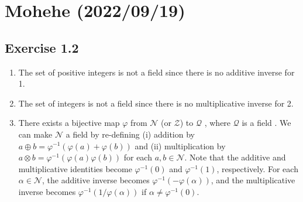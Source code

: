 \documentclass{article}
\newcommand\Z{\mathcal Z}
\newcommand\N{\mathcal N}
\newcommand\Q{\mathcal Q}
\begin{document}
\section{Mohehe (2022/09/19)}
\subsection{Exercise 1.2}
\begin{enumerate}[label = (\alph*)]
  \item The set of positive integers is not a field since there is no additive inverse for 1.
  \item The set of integers is not a field since there is no multiplicative inverse for 2.
  \item There exists a bijective map $\varphi$ from $\N$ (or $\Z$) to $\Q$ \cite{Q_countable}, where $\Q$ is a field \cite{Q_field}.
  	We can make $\N$ a field by re-defining (i) addition by $a \oplus b = \varphi^{-1} (\varphi(a) + \varphi(b))$ and (ii) multiplication by $a \otimes b = \varphi^{-1}(\varphi(a)\varphi(b))$ for each $a, b \in \N$.
    Note that the additive and multiplicative identities become $\varphi^{-1}(0)$ and $\varphi^{-1}(1)$, respectively.
    For each $\alpha\in\N$, the additive inverse becomes $\varphi^{-1}(-\varphi(\alpha))$, and the multiplicative inverse becomes $\varphi^{-1}(1/\varphi(\alpha))$ if $\alpha\ne\varphi^{-1}(0)$.
    

\end{enumerate}
\end{document}
